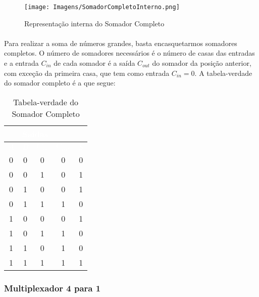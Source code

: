 \documentclass[a4paper,12pt]{article}
\begin{document}
\begin{figure}[H]
    \centering
    \texttt{[image: Imagens/SomadorCompletoInterno.png]}
    \caption{Representação interna do Somador Completo}
    \label{fig:somador_interna}
\end{figure}

\paragraph{}
Para realizar a soma de números grandes, basta encasquetarmos somadores completos. O número de somadores necessários é o número de casas das entradas e a entrada $C_{in}$ de cada somador é a saída $C_{out}$ do somador da posição anterior, com exceção da primeira casa, que tem como entrada $C_{in} = 0$. A tabela-verdade do somador completo é a que segue:

\begin{table}[H]
    \centering
    \begin{tabular}{|c|c|c|c|c|}
        \hline
        \rowcolor{black}
        \multicolumn{3}{|c|}{\textbf{\textcolor{white}{Entradas}}} & \multicolumn{2}{|c|}{\textbf{\textcolor{white}{Saídas}}} \\ \hline
        \rowcolor{black}
        \textcolor{white}{$A$} & \textcolor{white}{$B$} & \textcolor{white}{$C_{in}$} & \textcolor{white}{$C_{out}$} & \textcolor{white}{$S$} \\ \hline
        0 & 0 & 0 & 0 & 0 \\ \hline
        \rowcolor{lightgray}
        0 & 0 & 1 & 0 & 1 \\ \hline
        0 & 1 & 0 & 0 & 1 \\ \hline
        \rowcolor{lightgray}
        0 & 1 & 1 & 1 & 0 \\ \hline
        1 & 0 & 0 & 0 & 1 \\ \hline
        \rowcolor{lightgray}
        1 & 0 & 1 & 1 & 0 \\ \hline
        1 & 1 & 0 & 1 & 0 \\ \hline
        \rowcolor{lightgray}
        1 & 1 & 1 & 1 & 1 \\ \hline
    \end{tabular}
    \caption{Tabela-verdade do Somador Completo}
\end{table}

\subsubsection{Multiplexador 4 para 1}
\end{document}
